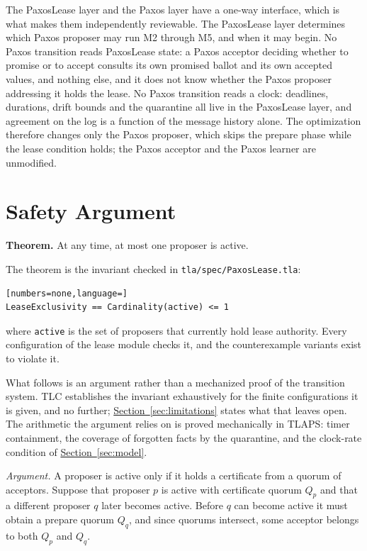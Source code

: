 \documentclass[final,5p,times,twocolumn,number]{elsarticle}
\newcommand{\code}[1]{\texttt{#1}}
\newcommand{\secref}[1]{\hyperref[#1]{Section~\ref*{#1}}}
\begin{document}
The PaxosLease layer and the Paxos layer have a one-way interface, which is what makes them independently reviewable.  The PaxosLease layer determines which Paxos proposer may run M2 through M5, and when it may begin.  No Paxos transition reads PaxosLease state: a Paxos acceptor deciding whether to promise or to accept consults its own promised ballot and its own accepted values, and nothing else, and it does not know whether the Paxos proposer addressing it holds the lease.  No Paxos transition reads a clock: deadlines, durations, drift bounds and the quarantine all live in the PaxosLease layer, and agreement on the log is a function of the message history alone.  The optimization therefore changes only the Paxos proposer, which skips the prepare phase while the lease condition holds; the Paxos acceptor and the Paxos learner are unmodified.

\section{Safety Argument}\label{sec:safety}

\medskip
\noindent\textbf{Theorem.} At any time, at most one proposer is active.
\medskip

The theorem is the invariant checked in \code{tla/spec/PaxosLease.tla}:

\begin{lstlisting}[numbers=none,language=]
LeaseExclusivity == Cardinality(active) <= 1
\end{lstlisting}

\noindent where \code{active} is the set of proposers that currently hold lease authority.  Every configuration of the lease module checks it, and the counterexample variants exist to violate it.

What follows is an argument rather than a mechanized proof of the transition system.  TLC establishes the invariant exhaustively for the finite configurations it is given, and no further; \secref{sec:limitations} states what that leaves open.  The arithmetic the argument relies on is proved mechanically in TLAPS: timer containment, the coverage of forgotten facts by the quarantine, and the clock-rate condition of \secref{sec:model}.

\emph{Argument.}  A proposer is active only if it holds a certificate from a quorum of acceptors.  Suppose that proposer $p$ is active with certificate quorum $Q_p$ and that a different proposer $q$ later becomes active.  Before $q$ can become active it must obtain a prepare quorum $Q_q$, and since quorums intersect, some acceptor belongs to both $Q_p$ and $Q_q$.
\end{document}
